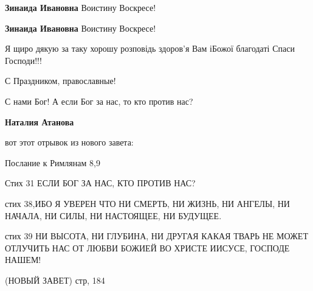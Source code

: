 \begin{itemize}
\begin{itemize}
\textbf{Зинаида Ивановна} Воистину Воскресе!

 
\textbf{Зинаида Ивановна} Воистину Воскресе!
\end{itemize}

 
Я щиро дякую за таку хорошу розповідь здоров'я Вам іБожої благодаті Спаси Господи!!!

 
С Праздником, православные!

С нами Бог! А если Бог за нас, то кто против нас?

\begin{itemize}
 
\textbf{Наталия Атанова} 

вот этот отрывок из нового завета:

Послание к Римлянам 8,9

Стих 31 ЕСЛИ БОГ ЗА НАС, КТО ПРОТИВ НАС?

стих 38,ИБО Я УВЕРЕН ЧТО НИ СМЕРТЬ, НИ ЖИЗНЬ, НИ АНГЕЛЫ, НИ НАЧАЛА, НИ СИЛЫ, НИ
НАСТОЯЩЕЕ, НИ БУДУЩЕЕ.

стих 39 НИ ВЫСОТА, НИ ГЛУБИНА, НИ ДРУГАЯ КАКАЯ ТВАРЬ НЕ МОЖЕТ ОТЛУЧИТЬ НАС ОТ
ЛЮБВИ БОЖИЕЙ ВО ХРИСТЕ ИИСУСЕ, ГОСПОДЕ НАШЕМ! 🙏🙏🙏

(НОВЫЙ ЗАВЕТ) стр, 184
\end{itemize}

 

\end{itemize}
